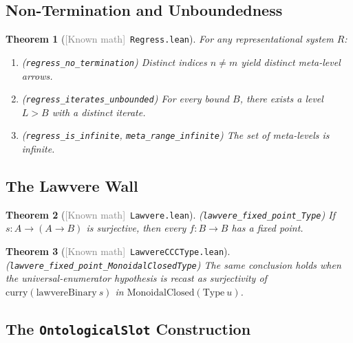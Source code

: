 \documentclass[11pt]{article}
\newtheorem{theorem}{Theorem}[section]
\newcommand{\leanref}[1]{\texttt{\small #1}}
\newcommand{\known}{\textcolor{gray}{[Known math]}}
\begin{document}
\subsection{Non-Termination and Unboundedness}

\begin{theorem}[\known\ \leanref{Regress.lean}]
\label{thm:regress}
For any representational system $R$:
\begin{enumerate}[label=(\alph*)]
\item (\leanref{regress\_no\_termination}) Distinct indices $n \neq m$ yield distinct meta-level arrows.
\item (\leanref{regress\_iterates\_unbounded}) For every bound $B$, there exists a level $L > B$ with a distinct iterate.
\item (\leanref{regress\_is\_infinite}, \leanref{meta\_range\_infinite}) The set of meta-levels is infinite.
\end{enumerate}
\end{theorem}


\subsection{The Lawvere Wall}
\label{sec:lawvere}

\begin{theorem}[\known\ \leanref{Lawvere.lean}]
\label{thm:lawvere}
(\leanref{lawvere\_fixed\_point\_Type}) If $s : A \to (A \to B)$ is surjective, then every $f : B \to B$ has a fixed point.
\end{theorem}

\begin{theorem}[\known\ \leanref{LawvereCCCType.lean}]
\label{thm:lawvere-ccc}
(\leanref{lawvere\_fixed\_point\_MonoidalClosedType}) The same conclusion holds when the universal-enumerator hypothesis is recast as surjectivity of $\mathrm{curry}(\mathrm{lawvereBinary}\ s)$ in $\mathrm{MonoidalClosed}(\mathrm{Type}\ u)$.
\end{theorem}


\subsection{The \texttt{OntologicalSlot} Construction}
\label{sec:ontoslot}
\end{document}
